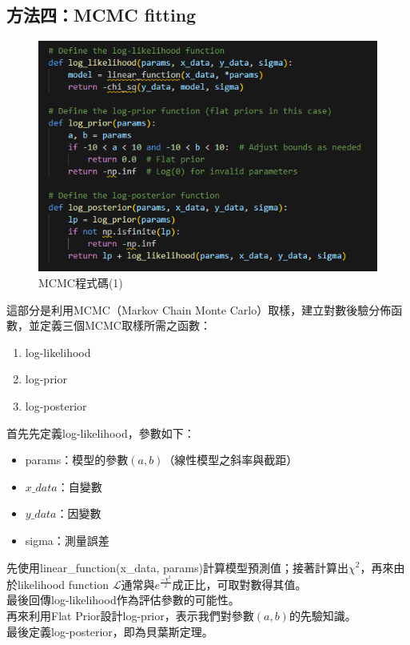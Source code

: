 \documentclass[12pt,a4paper]{article}
\begin{document}
\begin{CJK}{UTF8}{bkai}
\clearpage

\subsection{方法四：MCMC fitting}
\hfill

\begin{figure}[h]
    \centering
    \includegraphics[width=1\linewidth]{MCMC1.png}
    \caption{MCMC程式碼(1)}
    \label{fig:MCMC1}
\end{figure}

這部分是利用MCMC（Markov Chain Monte Carlo）取樣，建立對數後驗分佈函數，並定義三個MCMC取樣所需之函數：
\begin{enumerate}
    \item log-likelihood
    \item log-prior
    \item log-posterior
\end{enumerate}
\indent 首先先定義log-likelihood，參數如下：
\begin{itemize}
    \item params：模型的參數$(a,b)$（線性模型之斜率與截距）
    \item $x\_data$：自變數
    \item $y\_data$：因變數
    \item sigma：測量誤差
\end{itemize}
\indent 先使用linear\_function(x\_data, \*params)計算模型預測值；接著計算出$\chi^2$，再來由於likelihood function $\mathcal{L}$通常與$e^{\frac{-\chi^2}{2}}$成正比，可取對數得其值。\\
\indent 最後回傳log-likelihood作為評估參數的可能性。\\
\indent 再來利用Flat Prior設計log-prior，表示我們對參數$(a,b)$的先驗知識。\\
\indent 最後定義log-posterior，即為貝葉斯定理。


\end{CJK}
\end{document}

